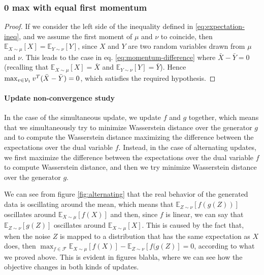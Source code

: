 \documentclass[12pt]{article}
\begin{document}
\subsubsection{0 max with equal first momentum} \label{subsub:zero-difference}
\begin{proof}
If we consider the left side of the inequality defined in \eqref{eq:expectation-ineq}, and we assume the first moment of $\mu$ and $\nu$ to coincide, then $\mathbb{E}_{X \sim \mu} [X] =  \mathbb{E}_{Y \sim \nu} [Y]$, since $X$ and $Y$ are two random variables drawn from $\mu$ and $\nu$. This leads to the case in eq. \eqref{eq:momentum-difference} where $\bar{X} - \bar{Y} = 0$ (recalling that $\mathbb{E}_{X \sim \mu} [X] = \bar{X}$ and $\mathbb{E}_{Y \sim \nu} [Y] = \bar{Y}$). Hence $\max_{v \in \mathcal{V}_1} v^{T}(\Bar{X} - \Bar{Y}) = 0$, which satisfies the required hypothesis.
\end{proof}

\paragraph{Update non-convergence study}
In the case of the simultaneous update, we update $f$ and $g$ together, which means that we simultaneously try to minimize Wasserstein distance over the generator $g$ and to compute the Wasserstein distance maximizing the difference between the expectations over the dual variable $f$. Instead, in the case of alternating updates, we first maximize the difference between the expectations over the dual variable $f$ to compute Wasserstein distance, and then we try minimize Wasserstein distance over the generator $g$.

We can see from figure \ref{fig:alternating} that the real behavior of the generated data is oscillating around the mean, which means that $\mathbb{E}_{Z \sim \nu} [f(g(Z))]$ oscillates around $\mathbb{E}_{X \sim \mu} [f(X)]$ and then, since $f$ is linear, we can say that $\mathbb{E}_{Z \sim \nu} [g(Z)]$ oscillates around $\mathbb{E}_{X \sim \mu} [X]$. This is caused by the fact that, when the noise $Z$ is mapped to a distribution that has the same expectation as $X$ does, then $\max_{f \in \mathcal{F}} \mathbb{E}_{X \sim \mu} [f(X)] -  \mathbb{E}_{Z \sim \nu} [f(g(Z)] = 0$, according to what we proved above. This is evident in figures blabla, where we can see how the objective changes in both kinds of updates.
\end{document}
